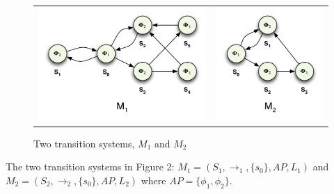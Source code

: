 \documentclass[12pt]{report}
\begin{document}
\begin{figure}[H]
	\centering
	\begin{tabular}{ l r }
		\includegraphics[scale=0.75]{../GFX/ExerciseFigure2-M1.pdf}
		& \includegraphics[scale=0.75]{../GFX/ExerciseFigure2-M2.pdf}
	\end{tabular}
	\caption{Two transition systems, $M_1$ and $M_2$}
\end{figure}
The two transition systems in Figure 2: $M_1 = (S_1,\rightarrow_1,\{s_0\},AP,L_1)$ and $M_2 = (S_2,\rightarrow_2,\{s_0\},AP,L_2)$ where $AP = \{\phi_1, \phi_2\}$.\\
\end{document}
